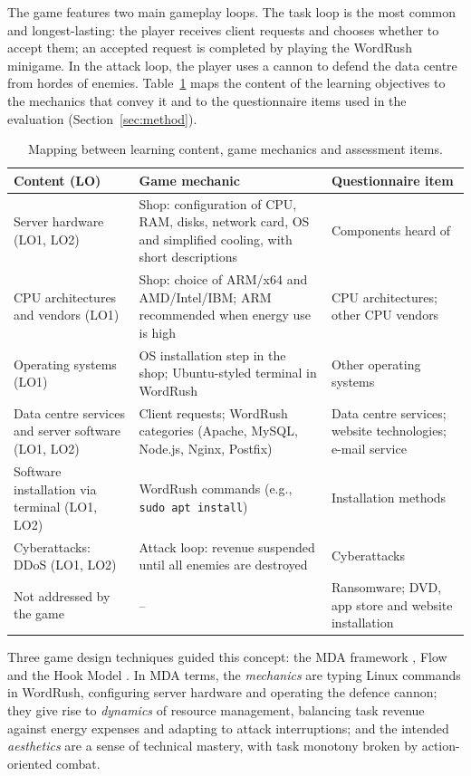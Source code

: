 \documentclass[runningheads]{llncs}
\begin{document}
The game features two main gameplay loops. The task loop is the most common and longest-lasting: the player receives client requests and chooses whether to accept them; an accepted request is completed by playing the WordRush minigame. In the attack loop, the player uses a cannon to defend the data centre from hordes of enemies. Table~\ref{tab:mapping} maps the content of the learning objectives to the mechanics that convey it and to the questionnaire items used in the evaluation (Section~\ref{sec:method}).

\begin{table}[htbp]
    \centering
    \caption{Mapping between learning content, game mechanics and assessment items.}
    \label{tab:mapping}
    \scriptsize
    \begin{tabular}{@{}>{\raggedright\arraybackslash}p{3.1cm}>{\raggedright\arraybackslash}p{4.8cm}>{\raggedright\arraybackslash}p{3.3cm}@{}}
        \toprule
        \textbf{Content (LO)} & \textbf{Game mechanic} & \textbf{Questionnaire item} \\ \midrule
        Server hardware (LO1, LO2) & Shop: configuration of CPU, RAM, disks, network card, OS and simplified cooling, with short descriptions & Components heard of \\
        CPU architectures and vendors (LO1) & Shop: choice of ARM/x64 and AMD/Intel/IBM; ARM recommended when energy use is high & CPU architectures; other CPU vendors \\
        Operating systems (LO1) & OS installation step in the shop; Ubuntu-styled terminal in WordRush & Other operating systems \\
        Data centre services and server software (LO1, LO2) & Client requests; WordRush categories (Apache, MySQL, Node.js, Nginx, Postfix) & Data centre services; website technologies; e-mail service \\
        Software installation via terminal (LO1, LO2) & WordRush commands (e.g., \texttt{sudo apt install}) & Installation methods \\
        Cyberattacks: DDoS (LO1, LO2) & Attack loop: revenue suspended until all enemies are destroyed & Cyberattacks \\
        Not addressed by the game & -- & Ransomware; DVD, app store and website installation \\
        \bottomrule
    \end{tabular}
\end{table}

Three game design techniques guided this concept: the MDA framework \cite{framework-mda}, Flow \cite{flow} and the Hook Model \cite{modelo-hook}. In MDA terms, the \emph{mechanics} are typing Linux commands in WordRush, configuring server hardware and operating the defence cannon; they give rise to \emph{dynamics} of resource management, balancing task revenue against energy expenses and adapting to attack interruptions; and the intended \emph{aesthetics} are a sense of technical mastery, with task monotony broken by action-oriented combat.
\end{document}
